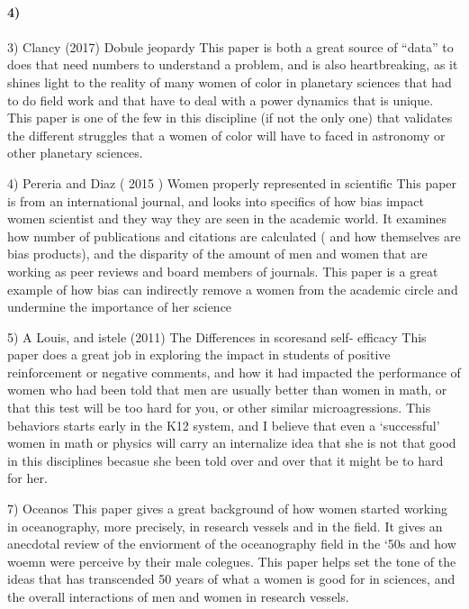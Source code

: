 \documentclass{tufte-handout}
\begin{document}
\paragraph{4)}
   
   \paragraph{}
3) Clancy  (2017) Dobule jeopardy 
This paper is both a great source of “data” to does that need numbers to understand a problem, and is also heartbreaking, as it shines light to the reality of many women of color in planetary sciences that had to do field work and that have to deal with a power dynamics that is unique. This paper is one of the few in this discipline (if not the only one) that validates the different struggles that a women of color will have to faced in astronomy or other planetary sciences.

4) Pereria and Diaz ( 2015 )  Women properly represented in scientific
This paper is from an international journal,  and looks into specifics of how bias impact women scientist and they way they are seen in the academic world. It examines how number of publications and citations are calculated  ( and how themselves are bias products), and the disparity of the amount of men and women that are working as peer reviews and board members of journals. This paper is a great example of how bias can indirectly remove a women from the academic circle and undermine the importance of her science

5) A Louis, and istele (2011) The Differences in scoresand self- efficacy
This paper does a great job in exploring the impact in students of positive reinforcement or negative comments, and how it had impacted the performance of women who had been told that men are usually better than women in math, or that this test will be too hard for you, or other similar microagressions. This behaviors starts early in the K12 system, and I believe that even a `successful’ women in math or physics will carry an internalize idea that she is not that good in this disciplines becasue she been told over and over that it might be to hard for her. 


7) Oceanos
This paper gives a great background of how women started working in oceanography, more precisely, in research vessels and in the field. It gives an anecdotal review of the enviorment of the oceanography field in the ‘50s and how woemn were perceive by their male colegues. This paper helps set the tone of the ideas that has transcended 50 years of what a women is good for in sciences, and the overall interactions of men and women in research vessels.
\end{document}
